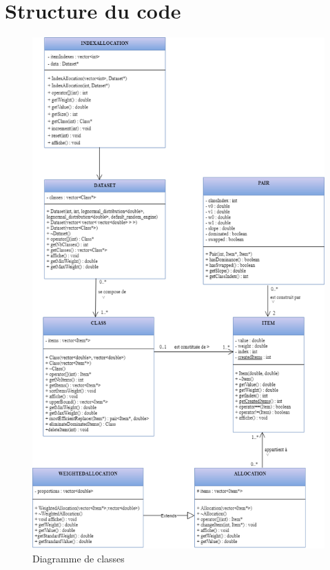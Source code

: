 \documentclass{article}
\begin{document}
\section{Structure du code}

\begin{figure}[!ht]
	\centering
	\includegraphics[width=14cm]{KnapsackClasses.png}
	\caption{Diagramme de classes}
	\label{fig:diagramme}
\end{figure}
\end{document}
